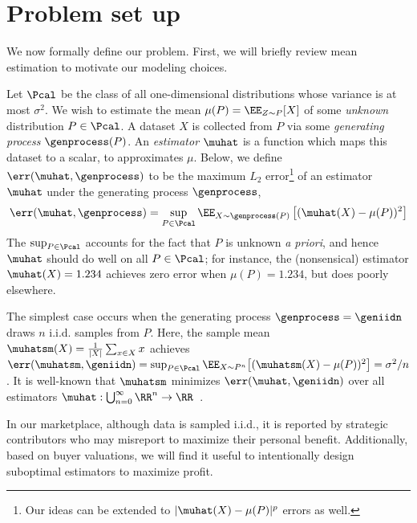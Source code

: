\section{Problem set up}

We now formally define our problem. 
First, we will briefly review mean estimation to motivate our modeling choices.

Let $\Pcal$ be the class of all one-dimensional distributions whose variance is at most $\sigma^2$.
We wish to estimate the mean $\mu(P) = \EE_{Z\sim P}[X]$ of some \emph{unknown} distribution $P\in\Pcal$.
A dataset $X$ is collected from $P$ via some \emph{generating process} $\genprocess(P)$.
An \emph{estimator} $\muhat$ is a function which maps this dataset to a scalar, to approximates $\mu$.
Below, we define $\err(\muhat, \genprocess)$ to be
the maximum $L_2$ error\footnote{%
Our ideas can be extended to $|\muhat(X)-\mu(P)|^p$ errors as well.} of an estimator $\muhat$ under the generating process $\genprocess$,
\begin{align}
    \label{eqn:err}
    \err(\muhat, \genprocess) = %
        \sup_{P\in\Pcal} \EE_{X\sim \genprocess(P)}\left[
        (\muhat(X) - \mu(P))^2
    \right]      
\end{align}
The $\sup_{P\in\Pcal}$ accounts for the fact that $P$ is unknown
\emph{a priori}, and hence $\muhat$ should do well on all $P\in\Pcal$;
for instance, the (nonsensical) estimator $\muhat(X) = 1.234$ achieves zero error when $\mu(P) = 1.234$, but does poorly elsewhere.



The simplest case occurs when the generating process $\genprocess = \geniidn$ draws $n$ i.i.d. samples from $P$. Here, the sample mean $\muhatsm(X) = \frac{1}{|X|}\sum_{x \in X} x$ achieves 
$\err(\muhatsm, \geniidn) = \sup_{P \in \Pcal} \EE_{X \sim P^n} \big[(\muhatsm(X) - \mu(P))^2\big] = \sigma^2/n$.
It is well-known
that $\muhatsm$ minimizes $\err(\muhat, \geniidn)$ over all estimators $\muhat: \bigcup_{n=0}^\infty \RR^n \to \RR$~\citep{stein1956inadmissibility}.



In our marketplace, although data is sampled i.i.d., it is reported by strategic contributors who may misreport to maximize their personal benefit. Additionally, based on buyer valuations, we will find it useful to intentionally design suboptimal estimators to maximize profit.


